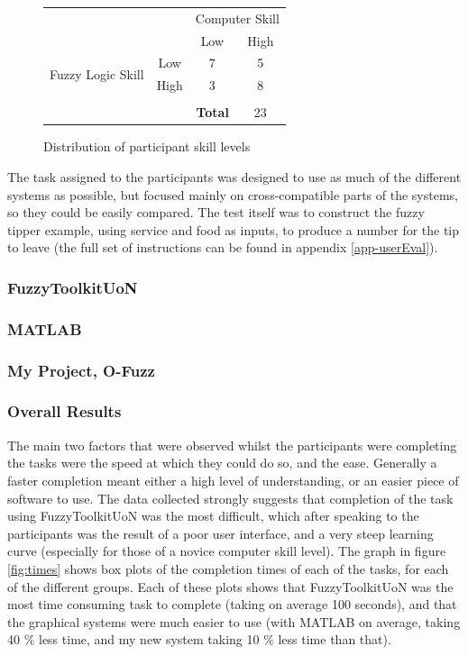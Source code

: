 {\begin{figure}[ht!]
\begin{center}
\begin{tabular}{cc|cc}
	& &\multicolumn{2}{c}{Computer Skill} \\
	& & Low & High \\
	\hline 
    \multirow{2}{2cm}{Fuzzy Logic Skill}  & Low & 7 & 5  \\
     &  High                                    & 3 & 8  \\
     \hline
     \\
     \multicolumn{3}{r}{\textbf{Total}} & 23\\
\end{tabular}
\end{center}
\vspace{-5mm}
\caption{Distribution of participant skill levels}
\label{fig-skills}
\vspace{-2mm}
\end{figure}
\noindent 
The task assigned to the participants was designed to use as much of the different systems as possible, but focused mainly on cross-compatible parts of the systems, so they could be easily compared. The test itself was to construct the fuzzy tipper example, using service and food as inputs, to produce a number for the tip to leave (the full set of instructions can be found in appendix \ref{app-userEval}). 


\subsubsection{FuzzyToolkitUoN}
\subsubsection{MATLAB}
\subsubsection{My Project, O-Fuzz}

\subsubsection{Overall Results}
The main two factors that were observed whilst the participants were completing the tasks were the speed at which they could do so, and the ease. Generally a faster completion meant either a high level of understanding, or an easier piece of software to use. The data collected strongly suggests that completion of the task using FuzzyToolkitUoN was the most difficult, which after speaking to the participants was the result of a poor user interface, and a very steep learning curve (especially for those of a novice computer skill level). The graph in figure \ref{fig:times} shows box plots of the completion times of each of the tasks, for each of the different groups. Each of these plots shows that FuzzyToolkitUoN was the most time consuming task to complete (taking on average {\color{red} 100 seconds}), and that the graphical systems were much easier to use (with MATLAB on average, taking {\color{red} 40 \%} less time, and my new system taking {\color{red} 10 \%} less time than that).

}
